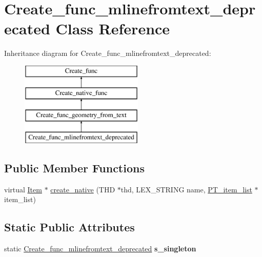 \hypertarget{classCreate__func__mlinefromtext__deprecated}{}\section{Create\+\_\+func\+\_\+mlinefromtext\+\_\+deprecated Class Reference}
\label{classCreate__func__mlinefromtext__deprecated}
Inheritance diagram for Create\+\_\+func\+\_\+mlinefromtext\+\_\+deprecated\+:\begin{figure}[H]
\begin{center}
\leavevmode
\includegraphics[height=4.000000cm]{classCreate__func__mlinefromtext__deprecated}
\end{center}
\end{figure}
\subsection*{Public Member Functions}
\begin{DoxyCompactItemize}
\item 
virtual \mbox{\hyperlink{classItem}{Item}} $\ast$ \mbox{\hyperlink{classCreate__func__mlinefromtext__deprecated_ac980d27d0c98fd6a1957cdef2642f1dd}{create\+\_\+native}} (T\+HD $\ast$thd, L\+E\+X\+\_\+\+S\+T\+R\+I\+NG name, \mbox{\hyperlink{classPT__item__list}{P\+T\+\_\+item\+\_\+list}} $\ast$item\+\_\+list)
\end{DoxyCompactItemize}
\subsection*{Static Public Attributes}
\begin{DoxyCompactItemize}
\item 
\mbox{\label{classCreate__func__mlinefromtext__deprecated_a498789a076bce3d405c3ebe09ad0ed02}} 
static \mbox{\hyperlink{classCreate__func__mlinefromtext__deprecated}{Create\+\_\+func\+\_\+mlinefromtext\+\_\+deprecated}} {\bfseries s\+\_\+singleton}
\end{DoxyCompactItemize}
